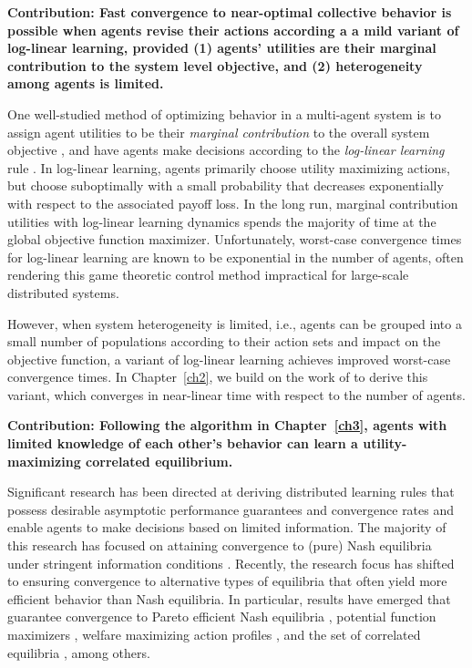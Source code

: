 \smallskip

\noindent \textbf{Contribution: Fast convergence to near-optimal collective behavior is possible when agents revise their actions according a a mild variant of log-linear learning, provided (1) agents' utilities are their marginal contribution to the system level objective, and (2) heterogeneity among agents is limited.}


One well-studied method of optimizing behavior in a multi-agent system is to assign agent utilities to be their {\it marginal contribution} to the overall system objective \cite{Wolpert1999}, and have agents make decisions according to the {\it log-linear learning} rule \cite{Blume1993}. In log-linear learning, agents primarily choose utility maximizing actions, but choose suboptimally with a small probability that decreases exponentially with respect to the associated payoff loss. In the long run, marginal contribution utilities with log-linear learning dynamics spends the majority of time at the global objective function maximizer. Unfortunately, worst-case convergence times for log-linear learning are known to be exponential in the number of agents, \cite{Shah2010} often rendering this game theoretic control method impractical for large-scale distributed systems. 

However, when system heterogeneity is limited, i.e., agents can be grouped into a small number of populations according to their action sets and impact on the objective function, a variant of log-linear learning achieves improved worst-case convergence times. In Chapter~\ref{ch2}, we build on the work of \cite{Shah2010} to derive this variant, which converges in near-linear time with respect to the number of agents. 


\smallskip

\noindent\textbf{Contribution: Following the algorithm in Chapter~\ref{ch3}, agents with limited knowledge of each other's behavior can learn a utility-maximizing correlated equilibrium.}


Significant research has been directed at deriving distributed learning rules that possess desirable asymptotic performance guarantees and convergence rates and enable agents to make decisions based on limited information. The majority of this research has focused on attaining convergence to (pure) Nash equilibria under stringent information conditions \cite{Young2009, Frihauf2012, Foster2006, Boussaton2012, Poveda2013, Gharesifard2012}. Recently, the research focus has shifted to ensuring convergence to alternative types of equilibria that often yield more efficient behavior than Nash equilibria.  In particular, results have emerged that guarantee convergence to Pareto efficient Nash equilibria \cite{Marden2009,Pradelski2012}, potential function maximizers \cite{Blume1993, Marden2012}, welfare maximizing action profiles \cite{Marden2011, Arieli2012}, and the set of correlated equilibria \cite{Hart2000,Marden2013c,Aumann1987,Foster1997}, among others.  

